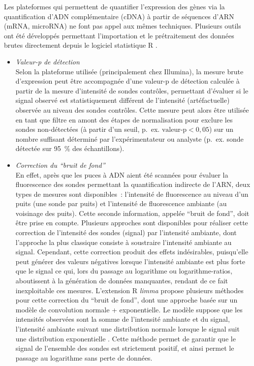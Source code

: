 \documentclass[11pt,a4paper,notrimn]{krantz}
\theoremstyle{definition}
\theoremstyle{definition}
\theoremstyle{remark}
\begin{document}
Les plateformes qui permettent de quantifier l'expression des gènes via
la quantification d'ADN complémentaire (cDNA) à partir de séquences
d'ARN (mRNA, microRNA) ne font pas appel aux mêmes techniques. Plusieurs
outils ont été développés permettant l'importation et le prétraitement
des données brutes directement depuis le logiciel statistique R
\citep{R-limma, R-AgiMicroRna}.

\begin{itemize}
\item
  \emph{Valeur-p de détection}\\
  Selon la plateforme utilisée (principalement chez Illumina), la mesure
  brute d'expression peut être accompagnée d'une valeur-p de détection
  calculée à partir de la mesure d'intensité de sondes contrôles,
  permettant d'évaluer si le signal observé est statistiquement
  différent de l'intensité (artéfactuelle) observée au niveau des sondes
  contrôles. Cette mesure peut alors être utilisée en tant que filtre en
  amont des étapes de normalisation pour exclure les sondes
  non-détectées (à partir d'un seuil, p.~ex. \(\textrm{valeur-p}<0,05\))
  sur un nombre suffisant déterminé par l'expérimentateur ou analyste
  (p.~ex. sonde détectée sur 95~\% des échantillons).
\item
  \emph{Correction du ``bruit de fond''}\\
  En effet, après que les puces à ADN aient été scannées pour évaluer la
  fluorescence des sondes permettant la quantification indirecte de
  l'ARN, deux types de mesures sont disponibles~: l'intensité de
  fluorescence au niveau d'un puits (une sonde par puits) et l'intensité
  de fluorescence ambiante (au voisinage des puits). Cette seconde
  information, appelée ``bruit de fond'', doit être prise en compte.
  Plusieurs approches sont disponibles pour réaliser cette correction de
  l'intensité des sondes (signal) par l'intensité ambiante, dont
  l'approche la plus classique consiste à soustraire l'intensité
  ambiante au signal. Cependant, cette correction produit des effets
  indésirables, puisqu'elle peut générer des valeurs négatives lorsque
  l'intensité ambiante est plus forte que le signal ce qui, lors du
  passage au logarithme ou logarithme-ratios, aboutissent à la
  génération de données manquantes, rendant de ce fait inexploitable ces
  mesures. L'extension R \emph{limma} \citep{R-limma} propose plusieurs
  méthodes pour cette correction du ``bruit de fond'', dont une approche
  basée sur un modèle de convolution normale + exponentielle. Le modèle
  suppose que les intensités observées sont la somme de l'intensité
  ambiante et du signal, l'intensité ambiante suivant une distribution
  normale lorsque le signal suit une distribution exponentielle
  \citep{irizarry_exploration_2003, silver_microarray_2009, ritchie_comparison_2007}.
  Cette méthode permet de garantir que le signal de l'ensemble des
  sondes est strictement positif, et ainsi permet le passage au
  logarithme sans perte de données.
\end{itemize}
\end{document}
